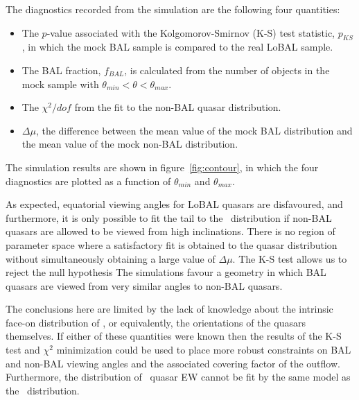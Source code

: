 The diagnostics recorded from the simulation are the following four
quantities:
\begin{itemize}
	\item The $p$-value associated with the Kolgomorov-Smirnov (K-S) 
	test statistic, $p_{KS}$, in which the mock BAL sample is compared
	to the real LoBAL sample.
	\item The BAL fraction, $f_{BAL}$, is calculated from the 
	number of objects in the mock sample with $\theta_{min}<\theta<\theta_{max}$.
	\item The $\chi^2/dof$ from the fit to the non-BAL quasar distribution.
	\item $\Delta \mu$, the difference between the mean value of the mock BAL
	distribution and the mean value of the mock non-BAL distribution.
\end{itemize}
The simulation results are shown in figure~\ref{fig:contour}, in which the 
four diagnostics are plotted as a function of $\theta_{min}$ 
and $\theta_{max}$. 

As expected, equatorial viewing angles for LoBAL quasars 
are disfavoured, and furthermore, it is only possible to fit
the tail to the \ewo\ distribution if non-BAL quasars are allowed 
to be viewed from high inclinations. There is no region of parameter
space where a satisfactory fit is obtained to the quasar distribution
without simultaneously obtaining a large value of $\Delta \mu$. The
K-S test allows us to reject the null hypothesis
The simulations favour a geometry in which BAL quasars are viewed
from very similar angles to non-BAL quasars.

The conclusions here are limited by the lack of knowledge about the 
intrinsic face-on distribution of \ewo, or equivalently,
the orientations of the quasars themselves. If either of these
quantities were known then the results of the
K-S test and $\chi^2$ minimization could be used
to place more robust constraints on BAL and non-BAL viewing angles 
and the associated covering factor of the outflow.
Furthermore, the distribution of \civ\ quasar EW cannot be fit by 
the same model as the \ewo\ distribution.

